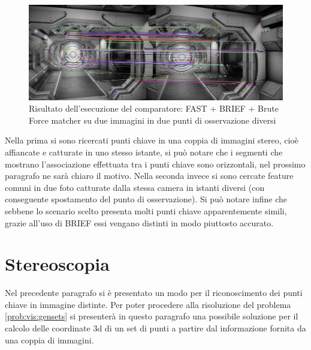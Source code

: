 \begin{figure}[h!]
	\centering
	\includegraphics[width=420pt]{imgs/TwoInstantDetection.jpg}
	\caption{Risultato dell'esecuzione del comparatore: FAST + BRIEF + Brute Force matcher su due immagini in due punti di osservazione diversi}
	\label{vis:feature:risTwo}
\end{figure} 
Nella prima si sono ricercati punti chiave in una coppia di immagini stereo, cioè affiancate e catturate in uno stesso istante, si può notare che i segmenti che mostrano l'associazione effettuata tra i punti chiave sono orizzontali, nel prossimo paragrafo ne sarà chiaro il motivo. Nella seconda invece si sono cercate feature comuni in due foto catturate dalla stessa camera in istanti diversi (con conseguente spostamento del punto di osservazione). Si può notare infine che sebbene lo scenario scelto presenta molti punti chiave apparentemente simili, grazie all'uso di BRIEF essi vengano distinti in modo piuttosto accurato. 
\section{Stereoscopia}
\label{sec:stereo}

Nel precedente paragrafo si è presentato un modo per il riconoscimento dei punti chiave in immagine distinte. Per poter procedere alla risoluzione del problema \ref{prob:vis:gensets} si presenterà in questo paragrafo una possibile soluzione per il calcolo delle coordinate 3d di un set di punti a partire dal informazione fornita da una coppia di immagini.




